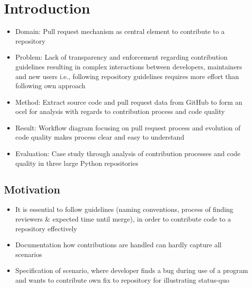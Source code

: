 \chapter{Introduction}
\label{chap:intro}

\begin{itemize}
	\item Domain: Pull request mechanism as central element to contribute to a repository \autocite{DBLP:conf/icse/TsayDH14}
	\item Problem: Lack of transparency and enforcement regarding contribution guidelines resulting in complex interactions between developers, maintainers and new users i.e., following repository guidelines requires more effort than following own approach
	\item Method: Extract source code and pull request data from GitHub to form an \ac{ocel} for analysis with regards to contribution process and code quality
	\item Result: Workflow diagram focusing on pull request process and evolution of code quality makes process clear and easy to understand
	\item Evaluation: Case study through analysis of contribution processes and code quality in three large Python repositories
\end{itemize}

\section{Motivation}
\label{sec:intro_ssec:motiv}
\begin{itemize}
	\item It is essential to follow guidelines (naming conventions, process of finding reviewers \& expected time until merge), in order to contribute code to a repository effectively
	\item Documentation how contributions are handled can hardly capture all scenarios
	\item Specification of scenario, where developer finds a bug during use of a program and wants to contribute own fix to repository for illustrating status-quo
\end{itemize}
